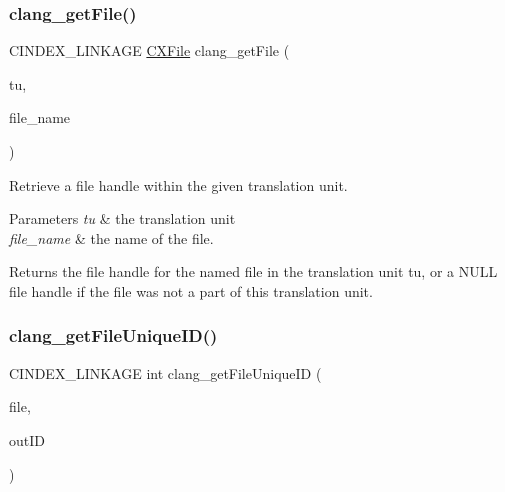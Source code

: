 \subsubsection{\texorpdfstring{clang\+\_\+get\+File()}{clang\_getFile()}}
{\footnotesize\ttfamily C\+I\+N\+D\+E\+X\+\_\+\+L\+I\+N\+K\+A\+GE \mbox{\hyperlink{group__CINDEX__FILES_gacfcea9c1239c916597e2e5b3e109215a}{C\+X\+File}} clang\+\_\+get\+File (\begin{DoxyParamCaption}\item[{\mbox{\hyperlink{group__CINDEX_gacdb7815736ca709ce9a5e1ec2b7e16ac}{C\+X\+Translation\+Unit}}}]{tu,  }\item[{const char $\ast$}]{file\+\_\+name }\end{DoxyParamCaption})}



Retrieve a file handle within the given translation unit. 


\begin{DoxyParams}{Parameters}
{\em tu} & the translation unit\\
\hline
{\em file\+\_\+name} & the name of the file.\\
\hline
\end{DoxyParams}
\begin{DoxyReturn}{Returns}
the file handle for the named file in the translation unit {\ttfamily tu}, or a N\+U\+LL file handle if the file was not a part of this translation unit. 
\end{DoxyReturn}
\mbox{\label{group__CINDEX__FILES_gafeef0a8288de8c14e95e4d6c249aaf1e}} 
\subsubsection{\texorpdfstring{clang\+\_\+get\+File\+Unique\+I\+D()}{clang\_getFileUniqueID()}}
{\footnotesize\ttfamily C\+I\+N\+D\+E\+X\+\_\+\+L\+I\+N\+K\+A\+GE int clang\+\_\+get\+File\+Unique\+ID (\begin{DoxyParamCaption}\item[{\mbox{\hyperlink{group__CINDEX__FILES_gacfcea9c1239c916597e2e5b3e109215a}{C\+X\+File}}}]{file,  }\item[{\mbox{\hyperlink{structCXFileUniqueID}{C\+X\+File\+Unique\+ID}} $\ast$}]{out\+ID }\end{DoxyParamCaption})}



